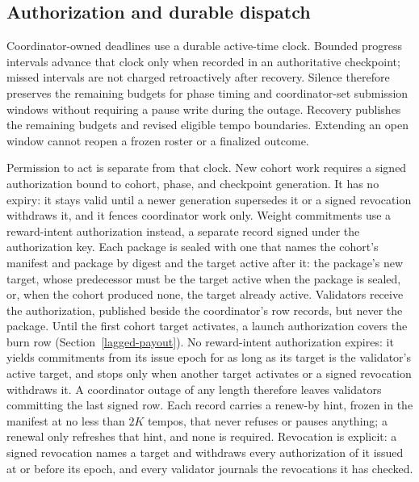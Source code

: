 \subsection{Authorization and durable dispatch}\label{authorization-dispatch}

Coordinator-owned deadlines use a durable active-time clock. Bounded progress
intervals advance that clock only when recorded in an authoritative checkpoint;
missed intervals are not charged retroactively after recovery. Silence therefore
preserves the remaining budgets for phase timing and coordinator-set submission
windows without requiring a pause write during the outage. Recovery publishes
the remaining budgets and revised eligible tempo boundaries. Extending an open
window cannot reopen a frozen roster or a finalized outcome.

Permission to act is separate from that clock. New cohort work requires a
signed authorization bound to cohort, phase, and checkpoint generation. It has
no expiry: it stays valid until a newer generation supersedes it or a signed
revocation withdraws it, and it fences coordinator work only. Weight commitments use a reward-intent
authorization instead, a separate record signed under the authorization key.
Each package is sealed with one that names the cohort's manifest and package by
digest and the target active after it: the package's new target, whose
predecessor must be the target active when the package is sealed, or, when the
cohort produced none, the target already active. Validators receive the
authorization, published beside the coordinator's row records, but never the
package. Until the first cohort target
activates, a launch authorization covers the burn row
(Section~\ref{lagged-payout}). No reward-intent authorization expires: it yields commitments
from its issue epoch for as long as its target is the validator's active
target, and stops only when another target activates or a signed revocation
withdraws it. A coordinator outage of any length therefore leaves validators
committing the last signed row. Each record carries a renew-by hint, frozen in
the manifest at no less than \(2K\) tempos, that never refuses or pauses
anything; a renewal only refreshes that hint, and none is required. Revocation
is explicit: a signed revocation names a target and withdraws every
authorization of it issued at or before its epoch, and every validator journals
the revocations it has checked.

